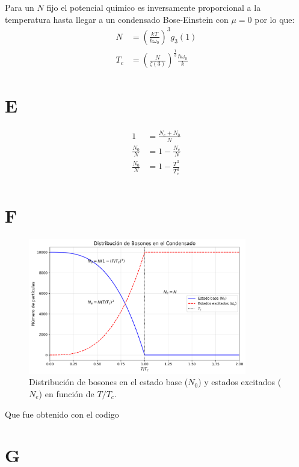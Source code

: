 \documentclass{report}
\begin{document}
Para un $N$ fijo el potencial quimico es inversamente proporcional a la temperatura hasta llegar a un condensado Bose-Einstein con $\mu = 0$ por lo que:
\begin{align*}
  N &= \left(\frac{kT}{\hbar \omega_0}\right)^3 g_3(1)\\
  T_c &= \left(\frac{N}{\zeta(3)}\right)^{\frac{1}{3}}\frac{\hbar\omega_0}{k}
\end{align*}

\section{E}

\begin{align*}
1 &= \frac{N_e + N_0}{N}\\
\frac{N_0}{N} &= 1 - \frac{N_e}{N}\\
\frac{N_0}{N} &= 1 - \frac{T^3}{T_c^3}\\
\end{align*}

\section{F}

\begin{figure}[H]
    \centering
    \includegraphics[width=0.85\textwidth]{code/n_0_N.png}
    \caption{Distribución de bosones en el estado base ($N_0$) y estados excitados ($N_e$) en función de $T/T_c$.}
    \label{fig:distribucion}
\end{figure}


Que fue obtenido con el codigo


\section{G}
\end{document}
